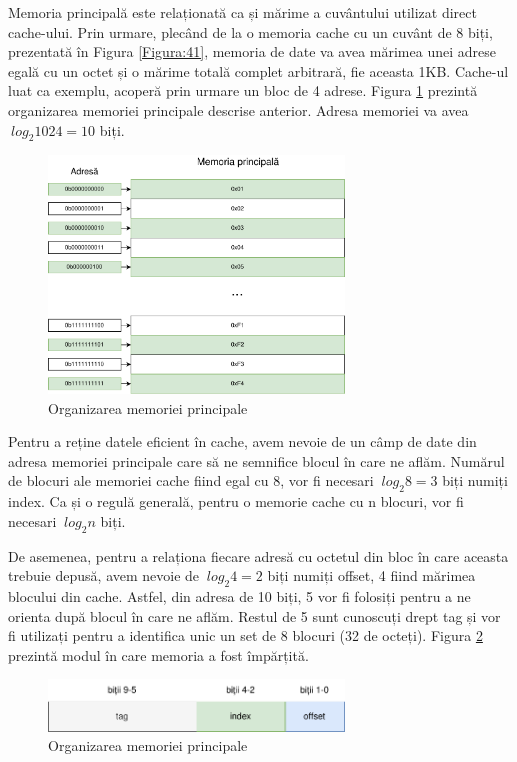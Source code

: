\documentclass[12pt]{article}
\begin{document}
Memoria principală este relaționată ca și mărime a cuvântului utilizat direct cache-ului. Prin urmare, plecând de la o memoria cache cu un cuvânt de 8 biți, prezentată în Figura \ref{Figura:41}, memoria de date va avea mărimea unei adrese egală cu un octet și o mărime totală complet arbitrară, fie aceasta 1KB. Cache-ul luat ca exemplu, acoperă prin urmare un bloc de 4 adrese. Figura \ref{Figura:42} prezintă organizarea memoriei principale descrise anterior. Adresa  memoriei va avea  $\  log_2 1024 = 10$ biți.

 \begin{figure}[h!]
 \includegraphics[width=0.7\textwidth]{mainmem2.pdf}
 \centering
 \caption{Organizarea memoriei principale}
 \label{Figura:42}
 \end{figure}
 
 
Pentru a reține datele eficient în cache, avem nevoie de un câmp de date din adresa memoriei principale care să ne semnifice blocul în care ne aflăm. Numărul de blocuri ale memoriei cache fiind egal cu 8, vor fi necesari $\  log_2 8 = 3 $ biți numiți index. Ca și o regulă generală, pentru o memorie cache cu n blocuri, vor fi necesari $\  log_2 n $ biți.

 De asemenea, pentru a relaționa fiecare adresă cu octetul din bloc în care aceasta trebuie depusă, avem nevoie de $\  log_2 4 = 2 $ biți numiți offset, 4 fiind mărimea blocului din cache. Astfel, din adresa de 10 biți, 5 vor fi folosiți pentru a ne orienta după blocul în care ne aflăm. Restul de 5 sunt cunoscuți drept tag și vor fi utilizați pentru a identifica unic un set de 8 blocuri (32 de octeți). Figura \ref{Figura:44} prezintă modul în care memoria a fost împărțită.

 \begin{figure}[h!]
 \includegraphics[width=0.7\textwidth]{memdivision.pdf}
 \centering
 \caption{Organizarea memoriei principale}
 \label{Figura:44}
 \end{figure}
 
\end{document}
